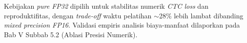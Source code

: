 Kebijakan \textit{pure FP32} dipilih untuk stabilitas numerik \textit{CTC loss} dan reproduktifitas, dengan \textit{trade-off} waktu pelatihan $\sim$28\% lebih lambat dibanding \textit{mixed precision FP16}. Validasi empiris analisis biaya-manfaat dilaporkan pada Bab V Subbab 5.2 (Ablasi Presisi Numerik).





